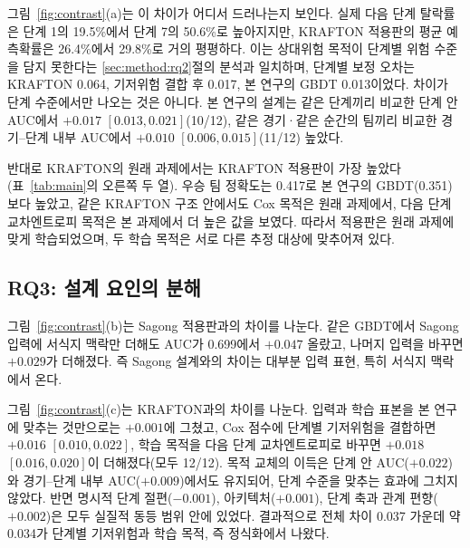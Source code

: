 그림~\ref{fig:contrast}(a)는 이 차이가 어디서 드러나는지 보인다.
실제 다음 단계 탈락률은 단계 1의 19.5\%에서 단계 7의 50.6\%로 높아지지만, KRAFTON 적용판의 평균 예측확률은 26.4\%에서 29.8\%로 거의 평평하다.
이는 상대위험 목적이 단계별 위험 수준을 담지 못한다는 \ref{sec:method:rq2}절의 분석과 일치하며, 단계별 보정 오차는 KRAFTON 0.064, 기저위험 결합 후 0.017, 본 연구의 GBDT 0.013이었다.
차이가 단계 수준에서만 나오는 것은 아니다. 본 연구의 설계는 같은 단계끼리 비교한 단계 안 AUC에서 $+0.017$ $[0.013, 0.021]$(10/12), 같은 경기·같은 순간의 팀끼리 비교한 경기--단계 내부 AUC에서 $+0.010$ $[0.006, 0.015]$(11/12) 높았다.

반대로 KRAFTON의 원래 과제에서는 KRAFTON 적용판이 가장 높았다(표~\ref{tab:main}의 오른쪽 두 열).
우승 팀 정확도는 0.417로 본 연구의 GBDT(0.351)보다 높았고, 같은 KRAFTON 구조 안에서도 Cox 목적은 원래 과제에서, 다음 단계 교차엔트로피 목적은 본 과제에서 더 높은 값을 보였다.
따라서 적용판은 원래 과제에 맞게 학습되었으며, 두 학습 목적은 서로 다른 추정 대상에 맞추어져 있다.

\subsection{RQ3: 설계 요인의 분해}
\label{sec:results:rq3}

그림~\ref{fig:contrast}(b)는 Sagong 적용판과의 차이를 나눈다.
같은 GBDT에서 Sagong 입력에 서식지 맥락만 더해도 AUC가 0.699에서 $+0.047$ 올랐고, 나머지 입력을 바꾸면 $+0.029$가 더해졌다.
즉 Sagong 설계와의 차이는 대부분 입력 표현, 특히 서식지 맥락에서 온다.

그림~\ref{fig:contrast}(c)는 KRAFTON과의 차이를 나눈다.
입력과 학습 표본을 본 연구에 맞추는 것만으로는 $+0.001$에 그쳤고, Cox 점수에 단계별 기저위험을 결합하면 $+0.016$ $[0.010, 0.022]$, 학습 목적을 다음 단계 교차엔트로피로 바꾸면 $+0.018$ $[0.016, 0.020]$이 더해졌다(모두 12/12).
목적 교체의 이득은 단계 안 AUC($+0.022$)와 경기--단계 내부 AUC($+0.009$)에서도 유지되어, 단계 수준을 맞추는 효과에 그치지 않았다.
반면 명시적 단계 절편($-0.001$), 아키텍처($+0.001$), 단계 축과 관계 편향($+0.002$)은 모두 실질적 동등 범위 안에 있었다.
결과적으로 전체 차이 0.037 가운데 약 0.034가 단계별 기저위험과 학습 목적, 즉 정식화에서 나왔다.

